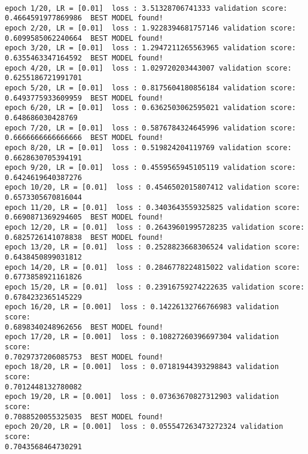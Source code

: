 \documentclass[11pt]{article}
\begin{document}
    \begin{Verbatim}[commandchars=\\\{\}]

epoch 1/20, LR = [0.01]  loss : 3.51328706741333 validation score:
0.4664591977869986  BEST MODEL found!
epoch 2/20, LR = [0.01]  loss : 1.9228394681757146 validation score:
0.6099585062240664  BEST MODEL found!
epoch 3/20, LR = [0.01]  loss : 1.2947211265563965 validation score:
0.6355463347164592  BEST MODEL found!
epoch 4/20, LR = [0.01]  loss : 1.029720203443007 validation score:
0.6255186721991701
epoch 5/20, LR = [0.01]  loss : 0.8175604180856184 validation score:
0.6493775933609959  BEST MODEL found!
epoch 6/20, LR = [0.01]  loss : 0.6362503062595021 validation score:
0.648686030428769
epoch 7/20, LR = [0.01]  loss : 0.5876784324645996 validation score:
0.6666666666666666  BEST MODEL found!
epoch 8/20, LR = [0.01]  loss : 0.519824204119769 validation score:
0.6628630705394191
epoch 9/20, LR = [0.01]  loss : 0.4559565945105119 validation score:
0.6424619640387276
epoch 10/20, LR = [0.01]  loss : 0.4546502015807412 validation score:
0.6573305670816044
epoch 11/20, LR = [0.01]  loss : 0.3403643559325825 validation score:
0.6690871369294605  BEST MODEL found!
epoch 12/20, LR = [0.01]  loss : 0.26439601995728235 validation score:
0.6825726141078838  BEST MODEL found!
epoch 13/20, LR = [0.01]  loss : 0.2528823668306524 validation score:
0.6438450899031812
epoch 14/20, LR = [0.01]  loss : 0.2846778224815022 validation score:
0.6773858921161826
epoch 15/20, LR = [0.01]  loss : 0.23916759274222635 validation score:
0.6784232365145229
epoch 16/20, LR = [0.001]  loss : 0.14226132766766983 validation score:
0.6898340248962656  BEST MODEL found!
epoch 17/20, LR = [0.001]  loss : 0.10827260396697304 validation score:
0.7029737206085753  BEST MODEL found!
epoch 18/20, LR = [0.001]  loss : 0.07181944393298843 validation score:
0.7012448132780082
epoch 19/20, LR = [0.001]  loss : 0.07363670827312903 validation score:
0.7088520055325035  BEST MODEL found!
epoch 20/20, LR = [0.001]  loss : 0.055547263473272324 validation score:
0.7043568464730291
\end{Verbatim}

    \begin{center}
    \end{center}
    { \hspace*{\fill} \\}
    
\end{document}
